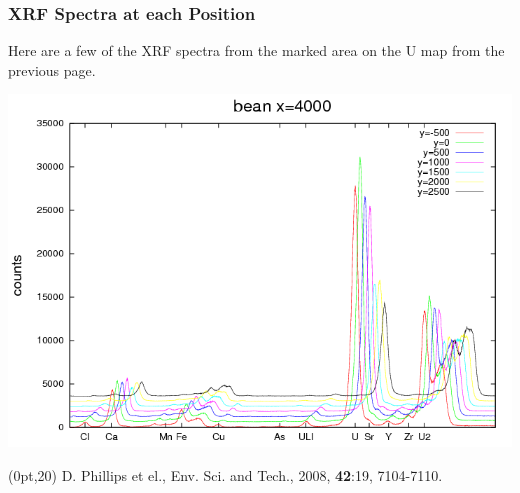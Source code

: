 \documentclass[10pt, xcolor=x11names, compress, handout]{beamer}
\begin{document}
\begin{frame}
  \frametitle{XRF Spectra at each Position}

  Here are a few of the XRF spectra from the marked area on the U map
  from the previous page.
  \begin{center}
    \includegraphics[width=0.7\linewidth]{xrf/beanx=4000.png}
  \end{center}
  \begin{textblock*}{0.5\linewidth}(0pt,20\TPVertModule)
    \tiny D. Phillips et el., Env. Sci. and Tech., 2008,
    \textbf{42}:19, 7104-7110.
  \end{textblock*}
\end{frame}
\end{document}

